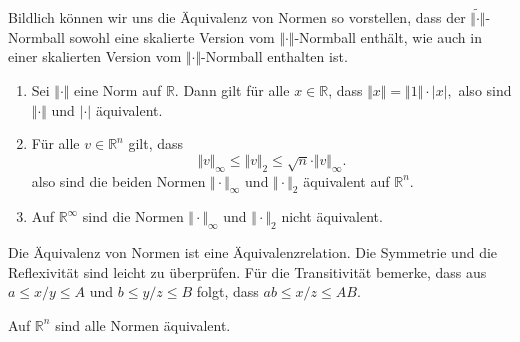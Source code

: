 \documentclass[../main.tex]{subfiles}
\begin{document}
Bildlich können wir uns die Äquivalenz von Normen so vorstellen,
dass der $\widetilde{\Vert \cdot \Vert}$-Normball
sowohl eine skalierte Version vom $\Vert \cdot \Vert$-Normball
enthält, wie auch in einer skalierten Version
vom $\Vert \cdot \Vert$-Normball enthalten ist.

\begin{examples}
  \leavevmode
  \begin{enumerate}[(1)]
    \item Sei $\Vert \cdot \Vert$ eine Norm auf $\mathbb{R}$.
      Dann gilt für alle $x \in \mathbb{R}$, dass
      \(
        \Vert x \Vert = \Vert 1 \Vert \cdot |x|,
      \)
      also sind $\Vert \cdot \Vert$ und $| \cdot |$ äquivalent.
    \item
      Für alle $v \in \mathbb{R}^n$ gilt, dass
      \[
        \Vert v \Vert_{\infty} \leq \Vert v \Vert_2
        \leq \sqrt{n} \cdot \Vert v \Vert_{\infty}.
      \]
      also sind die beiden Normen
      $\Vert \cdot \Vert_{\infty}$ und $\Vert \cdot \Vert_2$
      äquivalent auf $\mathbb{R}^{n}$.
    \item Auf $\mathbb{R}^{\infty}$ sind die Normen
      $\Vert \cdot \Vert_{\infty}$ und $\Vert \cdot \Vert_{2}$
      nicht äquivalent.
  \end{enumerate}
\end{examples}

\begin{remark}
  Die Äquivalenz von Normen ist eine Äquivalenzrelation.
  Die Symmetrie und die Reflexivität sind leicht zu überprüfen.
  Für die Transitivität bemerke, dass
  aus $a \leq x/y \leq A$ und $b \leq y/z \leq B$ folgt,
  dass $ab \leq x/z \leq AB$.
\end{remark}

\begin{theorem*}
  Auf $\mathbb{R}^n$ sind alle Normen äquivalent.
\end{theorem*}
\end{document}
